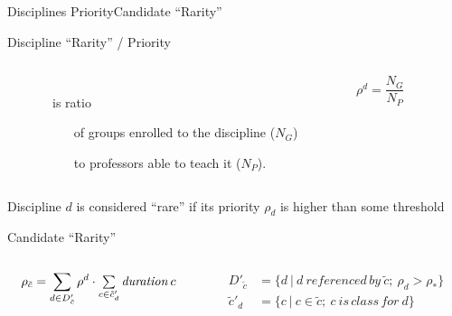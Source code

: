 \documentclass{beamer}
\begin{document}
\begin{frame}{Disciplines Priority}{Candidate ``Rarity''}
  \begin{block}{Discipline ``Rarity'' / Priority}
    \begin{columns}
      \begin{column}{-.5cm}\end{column}
      \begin{column}{.65\textwidth}\\
        is ratio
        \begin{itemize}
          \item[of] groups enrolled to the discipline ($N_G$)
          \item[to] professors able to teach it ($N_P$).
        \end{itemize}
      \end{column}
      \begin{column}{.1\textwidth}
        $$\rho^d = \dfrac{N_G}{N_P}$$
      \end{column}
      \begin{column}{.1\textwidth}\end{column}
    \end{columns}
    \bigskip
    Discipline $d$ is considered \alert{``rare''} if its priority
    $\rho_d$ is higher than some threshold
  \end{block}
  \begin{block}{Candidate ``Rarity''}
    \begin{columns}
      \begin{column}{.4\textwidth}
        \bigskip
        $$\rho_{\tilde{c}} = \sum\limits_{d \in D'_{\tilde{c}}}
                \rho^d \cdot \mathsmaller{ \sum\limits_{c \in \tilde{c}'_d}
                                     \mathit{duration}\, c }$$
      \end{column}
      \begin{column}{.4\textwidth}
        \begin{align*}
          D'_{\tilde{c}} &= \lbrace d ~|~ d ~\mathit{referenced\,by}~ \tilde{c};~
                                        \rho_d > \rho_* \rbrace\\
          \tilde{c}'_d &= \lbrace c ~|~ c \in \tilde{c};~ c ~\mathit{is\,class\,for}~ d \rbrace
        \end{align*}
      \end{column}
    \end{columns}
  \end{block}
\end{frame}
\end{document}
